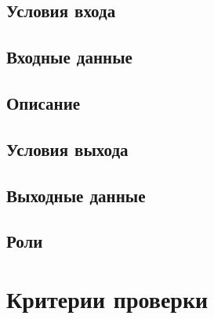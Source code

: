 \documentclass{tpks}
\begin{document}
\subsection{Условия входа}
\clarify{}
\subsection{Входные данные}
\clarify{}
\subsection{Описание}
\clarify{}
\subsection{Условия выхода}
\clarify{}
\subsection{Выходные данные}
\clarify{}
\subsection{Роли}
\clarify{}

\section{Критерии проверки}
\end{document}
